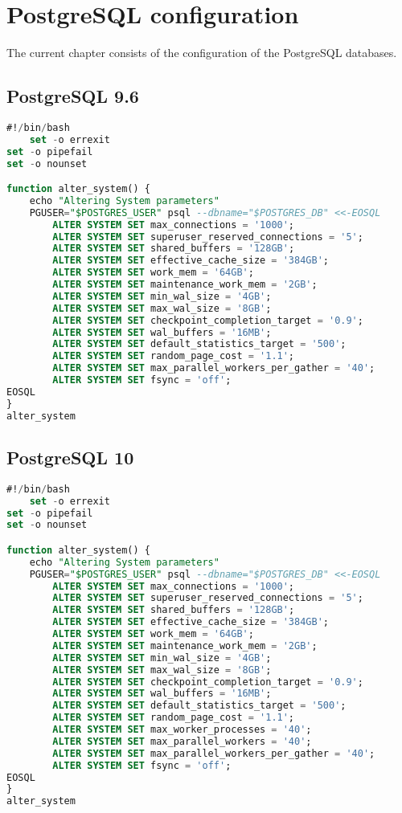 \chapter{PostgreSQL configuration}
\label{sec:config}
The current chapter consists of the configuration of the PostgreSQL databases.

\section{PostgreSQL 9.6}
\begin{lstlisting}[language=sql, caption={PostgreSQL 9.6 configuration},captionpos=b]
#!/bin/bash
	set -o errexit
set -o pipefail
set -o nounset

function alter_system() {
	echo "Altering System parameters"
	PGUSER="$POSTGRES_USER" psql --dbname="$POSTGRES_DB" <<-EOSQL
		ALTER SYSTEM SET max_connections = '1000';
		ALTER SYSTEM SET superuser_reserved_connections = '5';
		ALTER SYSTEM SET shared_buffers = '128GB';
		ALTER SYSTEM SET effective_cache_size = '384GB';
		ALTER SYSTEM SET work_mem = '64GB';
		ALTER SYSTEM SET maintenance_work_mem = '2GB';
		ALTER SYSTEM SET min_wal_size = '4GB';
		ALTER SYSTEM SET max_wal_size = '8GB';
		ALTER SYSTEM SET checkpoint_completion_target = '0.9';
		ALTER SYSTEM SET wal_buffers = '16MB';
		ALTER SYSTEM SET default_statistics_target = '500';
		ALTER SYSTEM SET random_page_cost = '1.1';
		ALTER SYSTEM SET max_parallel_workers_per_gather = '40';
		ALTER SYSTEM SET fsync = 'off';
EOSQL
}
alter_system
\end{lstlisting}

\newpage

\section{PostgreSQL 10}
\begin{lstlisting}[language=sql, caption={PostgreSQL 10 configuration},captionpos=b]
#!/bin/bash
	set -o errexit
set -o pipefail
set -o nounset

function alter_system() {
	echo "Altering System parameters"
	PGUSER="$POSTGRES_USER" psql --dbname="$POSTGRES_DB" <<-EOSQL
		ALTER SYSTEM SET max_connections = '1000';
		ALTER SYSTEM SET superuser_reserved_connections = '5';
		ALTER SYSTEM SET shared_buffers = '128GB';
		ALTER SYSTEM SET effective_cache_size = '384GB';
		ALTER SYSTEM SET work_mem = '64GB';
		ALTER SYSTEM SET maintenance_work_mem = '2GB';
		ALTER SYSTEM SET min_wal_size = '4GB';
		ALTER SYSTEM SET max_wal_size = '8GB';
		ALTER SYSTEM SET checkpoint_completion_target = '0.9';
		ALTER SYSTEM SET wal_buffers = '16MB';
		ALTER SYSTEM SET default_statistics_target = '500';
		ALTER SYSTEM SET random_page_cost = '1.1';
		ALTER SYSTEM SET max_worker_processes = '40';
		ALTER SYSTEM SET max_parallel_workers = '40';
		ALTER SYSTEM SET max_parallel_workers_per_gather = '40';
		ALTER SYSTEM SET fsync = 'off';
EOSQL
}
alter_system
\end{lstlisting}


